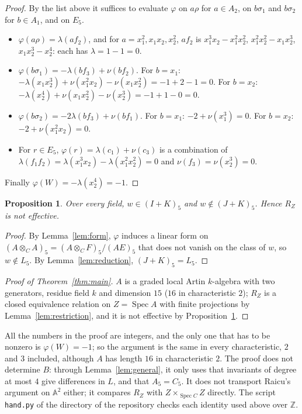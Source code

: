 \documentclass[11pt,a4paper]{amsart}
\newtheorem{proposition}[theorem]{Proposition}
\theoremstyle{remark}
\newcommand{\A}{\mathbb A}
\newcommand{\Z}{\mathbb Z}
\begin{document}
\begin{proof}
By the list above it suffices to evaluate $\varphi$ on $a\rho$ for $a \in A_2$, on $b\sigma_1$ and $b\sigma_2$ for $b \in A_1$, and on $E_5$.
\begin{itemize}
\item $\varphi(a\rho) = \lambda(af_2)$, and for $a = x_1^2, x_1x_2, x_2^2$, $af_2$ is $x_1^3x_2 - x_1^2x_2^2$, $x_1^2x_2^2 - x_1x_2^3$, $x_1x_2^3 - x_2^4$: each has $\lambda = 1 - 1 = 0$.
\item $\varphi(b\sigma_1) = -\lambda(bf_3) + \nu(bf_2)$. For $b = x_1$: $-\lambda(x_1x_2^3) + \nu(x_1^2x_2) - \nu(x_1x_2^2) = -1 + 2 - 1 = 0$. For $b = x_2$: $-\lambda(x_2^4) + \nu(x_1x_2^2) - \nu(x_2^3) = -1 + 1 - 0 = 0$.
\item $\varphi(b\sigma_2) = -2\lambda(bf_3) + \nu(bf_1)$. For $b = x_1$: $-2 + \nu(x_1^3) = 0$. For $b = x_2$: $-2 + \nu(x_1^2x_2) = 0$.
\item For $r \in E_5$, $\varphi(r) = \lambda(c_1) + \nu(c_3)$ is a combination of $\lambda(f_1f_2) = \lambda(x_1^3x_2) - \lambda(x_1^2x_2^2) = 0$ and $\nu(f_3) = \nu(x_2^3) = 0$.
\end{itemize}
Finally $\varphi(W) = -\lambda(x_2^4) = -1$.
\end{proof}

\begin{proposition}\label{prop:hand}
Over every field, $w \in (I + K)_5$ and $w \notin (J + K)_5$. Hence $R_Z$ is not effective.
\end{proposition}

\begin{proof}
By Lemma~\ref{lem:form}, $\varphi$ induces a linear form on $(A \otimes_C A)_5 = (A \otimes_C F)_5/(AE)_5$ that does not vanish on the class of $w$, so $w \notin L_5$. By Lemma~\ref{lem:reduction}, $(J + K)_5 = L_5$.
\end{proof}

\begin{proof}[Proof of Theorem~\ref{thm:main}]
$A$ is a graded local Artin $k$-algebra with two generators, residue field $k$ and dimension $15$ ($16$ in characteristic $2$); $R_Z$ is a closed equivalence relation on $Z = \operatorname{Spec} A$ with finite projections by Lemma~\ref{lem:restriction}, and it is not effective by Proposition~\ref{prop:hand}.
\end{proof}

All the numbers in the proof are integers, and the only one that has to be nonzero is $\varphi(W) = -1$; so the argument is the same in every characteristic, $2$ and $3$ included, although $A$ has length $16$ in characteristic $2$. The proof does not determine $B$: through Lemma~\ref{lem:general}, it only uses that invariants of degree at most $4$ give differences in $L$, and that $A_5 = C_5$. It does not transport Raicu's argument on $\A^2$ either; it compares $R_Z$ with $Z \times_{\operatorname{Spec} C} Z$ directly. The script \texttt{hand.py} of the directory  of the repository \cite{repo} checks each identity used above over $\Z$.
\end{document}
